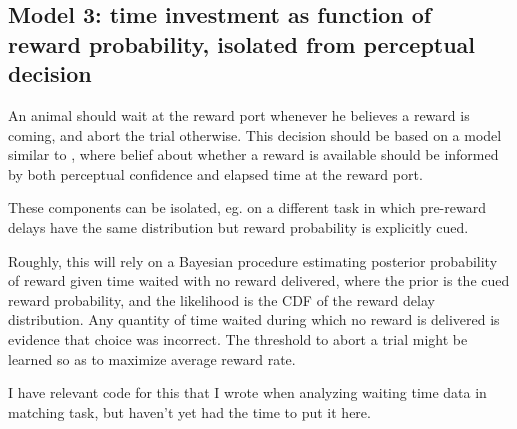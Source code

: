 \subsection{Model 3: time investment as function of reward probability, isolated from perceptual decision}

An animal should wait at the reward port whenever he believes a reward is coming, and abort the trial otherwise.
This decision should be based on a model similar to \cite{starkweather2017dopamine}, where belief about whether a reward is available should be informed by both perceptual confidence and elapsed time at the reward port.

These components can be isolated, eg. on a different task in which pre-reward delays have the same distribution but reward probability is explicitly cued.

Roughly, this will rely on a Bayesian procedure estimating posterior probability of reward given time waited with no reward delivered, where the prior is the cued reward probability, and the likelihood is the CDF of the reward delay distribution.
Any quantity of time waited during which no reward is delivered is evidence that choice was incorrect.
The threshold to abort a trial might be learned so as to maximize average reward rate.

I have relevant code for this that I wrote when analyzing waiting time data in matching task, but haven't yet had the time to put it here.